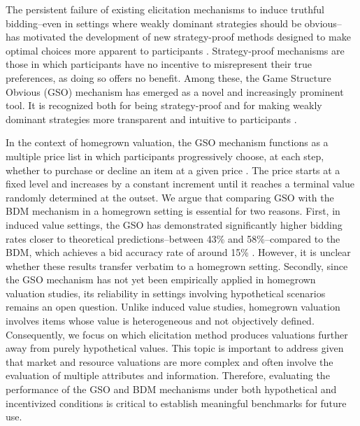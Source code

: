 \documentclass[12pt]{article}
\begin{document}
The persistent failure of existing elicitation mechanisms to induce truthful bidding--even in settings where weakly dominant strategies should be obvious-- has motivated the development of new strategy-proof methods designed to make optimal choices more apparent to participants \citep{li_obviously_2017, pycia_theory_2023}. Strategy-proof mechanisms are those in which participants have no incentive to misrepresent their true preferences, as doing so offers no benefit. Among these, the Game Structure Obvious (GSO) mechanism has emerged as a novel and increasingly prominent tool. It is recognized both for being strategy-proof and for making weakly dominant strategies more transparent and intuitive to participants \citep{chakraborty_future_2025}. 

In the context of homegrown valuation, the GSO mechanism functions as a multiple price list in which participants progressively choose, at each step, whether to purchase or decline an item at a given price \citep{yu2021multiple, herberich2012digging, jack2022multiple}.  The price starts at a fixed level and increases by a constant increment until it reaches a terminal value randomly determined at the outset. We argue that comparing GSO with the BDM mechanism in a homegrown setting is essential for two reasons. First, in induced value settings, the GSO  has demonstrated significantly higher bidding rates closer to theoretical predictions--between 43\% and 58\%--compared to the BDM, which achieves a bid accuracy rate of around 15\% \citep{chakraborty_future_2025}. However, it is unclear whether these results transfer verbatim to a homegrown setting. Secondly, since the GSO mechanism has not yet been empirically applied in homegrown valuation studies, its reliability in settings involving hypothetical scenarios remains an open question. 
Unlike induced value studies, homegrown valuation involves items whose value is heterogeneous and not objectively defined. Consequently, we focus on which elicitation method produces valuations further away from purely hypothetical values.  This topic is important to address given that market and resource valuations are more complex and often involve the evaluation of multiple attributes and information.  Therefore, evaluating the performance of the GSO and BDM mechanisms under both hypothetical and incentivized conditions is critical to establish meaningful benchmarks for future use. 
\end{document}
